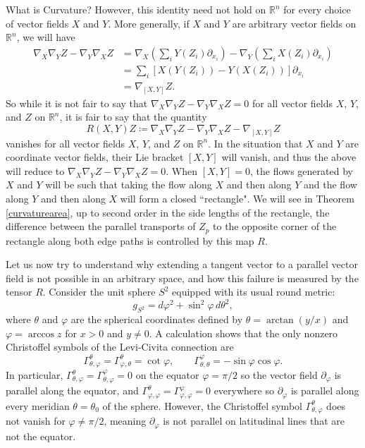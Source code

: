 \documentclass{article}
\numberwithin{equation}{subsection}
\theoremstyle{definition}
\begin{document}
\begin{section}{What is Curvature?}
However, this identity need not hold on $\mathbb{R}^n$ for every choice of vector fields $X$ and $Y$. More generally, if $X$ and $Y$ are arbitrary vector fields on $\mathbb{R}^n$, we will have
\begin{equation}
\begin{split}
\nabla_X\nabla_YZ-\nabla_Y\nabla_XZ&=\nabla_X\left(\sum_{i}{Y(Z_i)\partial_{x_i}}\right)-\nabla_Y\left(\sum_{i}{X(Z_i)\partial_{x_i}}\right)\\
&=\sum_{i}{\left[X(Y(Z_i))-Y(X(Z_i))\right]\partial_{x_i}}\\
&=\nabla_{[X,Y]}Z.
\end{split}
\end{equation}
So while it is not fair to say that $\nabla_X\nabla_YZ-\nabla_Y\nabla_XZ=0$ for all vector fields $X$, $Y$, and $Z$ on $\mathbb{R}^n$, it is fair to say that the quantity
\begin{equation}
R(X,Y)Z\coloneqq\nabla_X\nabla_YZ-\nabla_Y\nabla_XZ-\nabla_{[X,Y]}Z
\end{equation}
vanishes for all vector fields $X$, $Y$, and $Z$ on $\mathbb{R}^n$. In the situation that $X$ and $Y$ are coordinate vector fields, their Lie bracket $[X,Y]$ will vanish, and thus the above will reduce to $\nabla_X\nabla_YZ-\nabla_Y\nabla_XZ=0$. When $[X,Y]=0$, the flows generated by $X$ and $Y$ will be such that taking the flow along $X$ and then along $Y$ and the flow along $Y$ and then along $X$ will form a closed ``rectangle". We will see in Theorem \ref{curvaturearea}, up to second order in the side lengths of the rectangle, the difference between the parallel transports of $Z_p$ to the opposite corner of the rectangle along both edge paths is controlled by this map $R$.

Let us now try to understand why extending a tangent vector to a parallel vector field is not possible in an arbitrary space, and how this failure is measured by the tensor $R$. Consider the unit sphere $S^2$ equipped with its usual round metric:
\begin{equation}
g_{S^2}=d\varphi^2+\sin^2{\varphi}\, d\theta^2,
\end{equation}
where $\theta$ and $\varphi$ are the spherical coordinates defined by $\theta=\arctan{(y/x)}$ and $\varphi=\arccos{z}$ for $x>0$ and $y\neq0$. A calculation shows that the only nonzero Christoffel symbols of the Levi-Civita connection are
\begin{equation}
\Gamma_{\theta,\varphi}^{\theta}=\Gamma_{\varphi,\theta}^{\theta}=\cot{\varphi},\qquad \Gamma_{\theta,\theta}^{\varphi}=-\sin{\varphi}\cos{\varphi}.
\end{equation}
In particular, $\Gamma_{\theta,\varphi}^{\theta}=\Gamma_{\theta,\varphi}^{\varphi}=0$ on the equator $\varphi=\pi/2$ so the vector field $\partial_{\varphi}$ is parallel along the equator, and $\Gamma_{\varphi,\varphi}^{\theta}=\Gamma_{\varphi,\varphi}^{\varphi}=0$ everywhere so $\partial_{\varphi}$ is parallel along every meridian $\theta=\theta_0$ of the sphere. However, the Christoffel symbol $\Gamma_{\theta,\varphi}^{\theta}$ does not vanish for $\varphi\neq\pi/2$, meaning $\partial_{\varphi}$ is not parallel on latitudinal lines that are not the equator.


\end{section}
\end{document}
